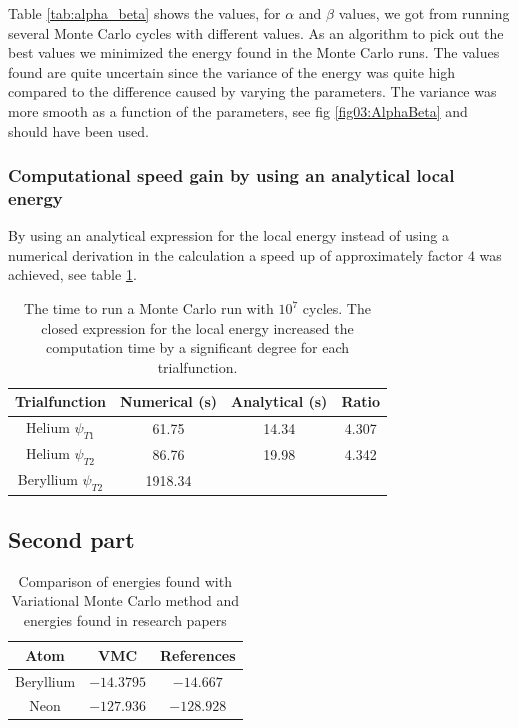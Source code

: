 \documentclass[11pt]{article}
\begin{document}
		Table \ref{tab:alpha_beta} shows the values, for \(\alpha\) and \(\beta\) values, we got from  running several Monte Carlo cycles with different values. As an algorithm to pick out the best values we minimized the energy found in the Monte Carlo runs. The values found are quite uncertain since the variance of the energy was quite high compared to the difference caused by varying the parameters. The variance was more smooth as a function of the parameters, see fig \ref{fig03:AlphaBeta} and should have been used.


		\subsubsection{Computational speed gain by using an analytical local energy}
			By using an analytical expression for the local energy instead of using a numerical derivation in the calculation a speed up of approximately factor \(4\) was achieved, see table \ref{tab:analyticVSNumeric}.


			\begin{table}
				\center
				\begin{tabular}{| c | c | c | c |}
				    \hline
				   	\textbf{Trialfunction} & Numerical (s) & Analytical (s) & Ratio
				    \\ \hline
				    Helium $\psi_{T1}$ & 61.75 & 14.34 & 4.307
				    \\ \hline
				    Helium $\psi_{T2}$ & 86.76 & 19.98	& 4.342
				    \\	\hline
				    Beryllium $\psi_{T2}$ & 1918.34  &	 &
 				    \\ \hline
				\end{tabular}
				\caption{The time to run a Monte Carlo run with \(10^7\) cycles. The closed expression for the local energy increased the computation time by a significant degree for each trialfunction. }
				\label{tab:analyticVSNumeric}
			\end{table}

\subsection{Second part}

	\begin{table}
		\center
			\begin{tabular}{|c|c|c|}
			    \hline
			   	Atom & VMC & References
			    \\ \hline
			    Beryllium & $-14.3795$ & $-14.667$
			    \\ \hline
			    Neon & $-127.936$ &  \(-128.928\)
			    \\	\hline
		  \end{tabular}
		  \caption{Comparison of energies found with Variational Monte Carlo method and
		energies found in research papers \cite{Koput:2011:PCCP} \cite{QUA:QUA560090204} }
		\label{tab:energyReference}
	\end{table}
\end{document}
